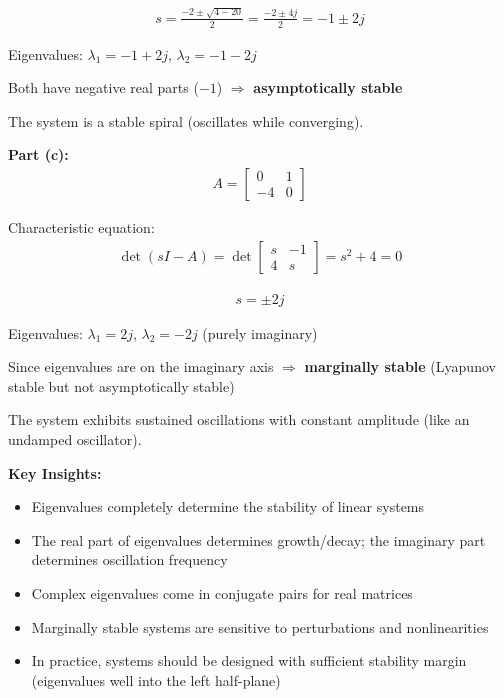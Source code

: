 \documentclass[11pt,a4paper]{article}
\begin{document}
\begin{align}
s = \frac{-2 \pm \sqrt{4-20}}{2} = \frac{-2 \pm 4j}{2} = -1 \pm 2j
\end{align}

Eigenvalues: $\lambda_1 = -1 + 2j$, $\lambda_2 = -1 - 2j$

Both have negative real parts ($-1$) $\Rightarrow$ \textbf{asymptotically stable}

The system is a stable spiral (oscillates while converging).

\textbf{Part (c):}
\begin{align}
A = \begin{bmatrix} 0 & 1 \\ -4 & 0 \end{bmatrix}
\end{align}

Characteristic equation:
\begin{align}
\det(sI - A) = \det\begin{bmatrix} s & -1 \\ 4 & s \end{bmatrix} = s^2 + 4 = 0
\end{align}

\begin{align}
s = \pm 2j
\end{align}

Eigenvalues: $\lambda_1 = 2j$, $\lambda_2 = -2j$ (purely imaginary)

Since eigenvalues are on the imaginary axis $\Rightarrow$ \textbf{marginally stable} (Lyapunov stable but not asymptotically stable)

The system exhibits sustained oscillations with constant amplitude (like an undamped oscillator).

\textbf{Key Insights:}
\begin{itemize}
\item Eigenvalues completely determine the stability of linear systems
\item The real part of eigenvalues determines growth/decay; the imaginary part determines oscillation frequency
\item Complex eigenvalues come in conjugate pairs for real matrices
\item Marginally stable systems are sensitive to perturbations and nonlinearities
\item In practice, systems should be designed with sufficient stability margin (eigenvalues well into the left half-plane)
\end{itemize}
\end{document}
